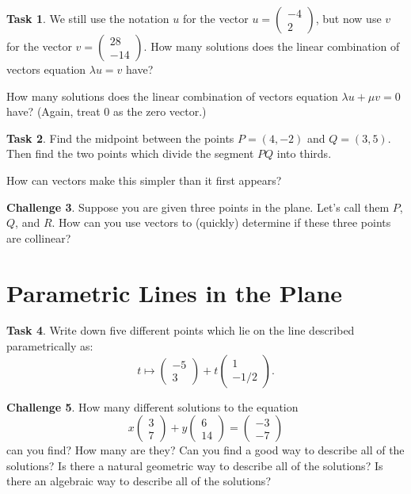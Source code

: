 \documentclass{tufte-book}
\theoremstyle{definition}
\newtheorem{task}{Task}
\newtheorem{challenge}[task]{Challenge}
\begin{document}
\begin{task}
We still use the notation $u$ for the vector $u = \left(\begin{smallmatrix} -4 \\ 2\end{smallmatrix}\right)$, but now use $v$ for the vector $v = \left(\begin{smallmatrix} 28 \\ -14\end{smallmatrix}\right)$.
How many solutions does the linear combination of vectors equation $\lambda u = v$
have?

How many solutions does the linear combination of vectors equation 
$\lambda u + \mu v = 0$ have? (Again, treat $0$ as the zero vector.)
\end{task}

\begin{task}
Find the midpoint between the points $P = (4,-2)$ and $Q=(3,5)$. Then find the two points which divide the segment $PQ$ into thirds.

How can vectors make this simpler than it first appears?
\end{task}

\begin{challenge}
Suppose you are given three points in the plane. Let's call them $P$, $Q$, and $R$.
How can you use vectors to (quickly) determine if these three points are collinear?
\end{challenge}

\section*{Parametric Lines in the Plane}

\begin{task}
Write down five different points which lie on the line described parametrically as:
\[
t \mapsto \begin{pmatrix} -5\\3 \end{pmatrix} + t \begin{pmatrix}1\\-1/2\end{pmatrix}.
\]
\end{task}


\begin{challenge}
How many different solutions to the equation
\[
x\begin{pmatrix} 3 \\ 7\end{pmatrix} + y \begin{pmatrix} 6 \\ 14 \end{pmatrix}
= \begin{pmatrix} -3 \\ -7 \end{pmatrix}
\]
can you find? How many are they? Can you find a good way to describe all of the solutions? Is there a natural geometric way to describe all of the solutions? Is there an algebraic way to describe all of the solutions?
\end{challenge}
\end{document}

